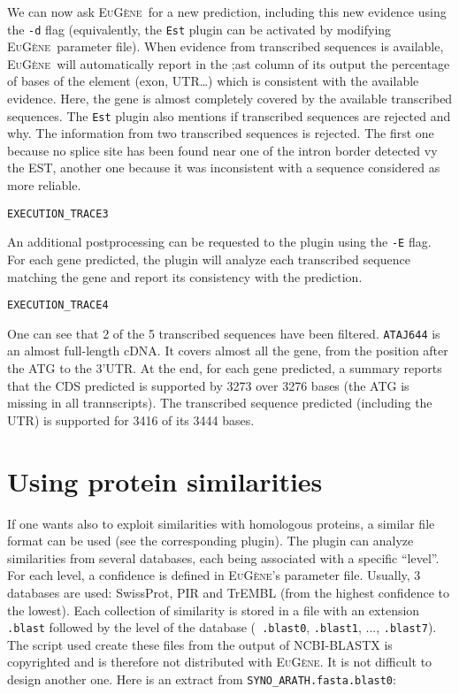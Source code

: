\documentclass[a4paper,titlepage]{report}
\newcommand{\EuGenie}{\textsc{EuG\`ene}}
\begin{document}
We can now ask \EuGenie\ for a new prediction, including this new
evidence using the \texttt{-d} flag (equivalently, the \texttt{Est}
plugin can be activated by modifying \EuGenie\ parameter file).  When
evidence from transcribed sequences is available, \EuGenie\ will
automatically report in the ;ast column of its output the percentage
of bases of the element (exon, UTR\ldots) which is consistent with the
available evidence. Here, the gene is almost completely covered by the
available transcribed sequences. The \texttt{Est} plugin also mentions
if transcribed sequences are rejected and why. The information from
two transcribed sequences is rejected. The first one because no splice
site has been found near one of the intron border detected vy the EST,
another one because it was inconsistent with a sequence considered as
more reliable.

\begin{Verbatim}[fontsize=\scriptsize]
EXECUTION_TRACE3
\end{Verbatim}

An additional postprocessing can be requested to the plugin using the
\texttt{-E} flag. For each gene predicted, the plugin will analyze
each transcribed sequence matching the gene and report its consistency
with the prediction.

\begin{Verbatim}[fontsize=\scriptsize]
EXECUTION_TRACE4
\end{Verbatim}

One can see that 2 of the 5 transcribed sequences have been filtered.
\texttt{ATAJ644} is an almost full-length cDNA. It covers almost all
the gene, from the position after the ATG to the 3'UTR. At the end,
for each gene predicted, a summary reports that the CDS predicted is
supported by 3273 over 3276 bases (the ATG is missing in all
trannscripts). The transcribed sequence predicted (including the UTR)
is supported for 3416 of its 3444 bases.

\section{Using protein similarities}

If one wants also to exploit similarities with homologous proteins, a
similar file format can be used (see the corresponding plugin). The
plugin can analyze similarities from several databases, each being
associated with a specific ``level''. For each level, a confidence is
defined in \EuGenie's parameter file. Usually, 3 databases are used:
SwissProt, PIR and TrEMBL (from the highest confidence to the
lowest). Each collection of similarity is stored in a file with an
extension \texttt{.blast} followed by the level of the database
(\texttt{ .blast0}, \texttt{.blast1}, ..., \texttt{.blast7}).  The
script used create these files from the output of NCBI-BLASTX is
copyrighted and is therefore not distributed with \EuGenie. It is not
difficult to design another one. Here is an extract from
\texttt{SYNO\_ARATH.fasta.blast0}:
\end{document}
